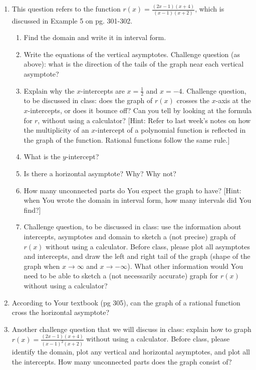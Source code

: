 \documentclass[12pt,dvipsnames]{article}
\begin{document}
\begin{enumerate}[label=\arabic*., leftmargin=2\parindent,
labelindent=\parindent, labelsep=*]
\begin{enumerate}
\end{enumerate}
\item This question refers to the function $\displaystyle r(x)=\frac{(2x-1)(x+4)}{(x-1)(x+2)}$, which is discussed in Example 5 on pg. 301-302.
\begin{enumerate}
\item Find the domain and write it in interval form.
\item Write the equations of the vertical asymptotes. Challenge question (as above): what is the direction of the tails of the graph near each vertical asymptote?
	\item Explain why the $x$-intercepts are $\displaystyle x=\frac{1}{2}$ and $x=-4$. Challenge question, to be discussed in class:  does the graph of $r(x)$ crosses the $x$-axis at the $x$-intercepts, or does it bounce off? Can you tell by looking at the formula for $r$, without using a calculator? [Hint: Refer to last week's notes on how the multiplicity of an $x$-intercept of a polynomial function is reflected in the graph of the function. Rational functions follow the same rule.]
\item What is the $y$-intercept?
\item Is there a horizontal asymptote? Why? Why not?
\item How many unconnected parts do You expect the graph to have? [Hint: when You wrote the domain in interval form, how many intervals did You find?]
\item Challenge question, to be discussed in class: use the information about intercepts, asymptotes and domain to sketch a (not precise) graph of $r(x)$ without using a calculator. Before class, please plot all asymptotes and intercepts, and draw the left and right tail of the graph (shape of the graph when $x\to \infty$ and $x\to -\infty$). What other information would You need to be able to sketch a (not necessarily accurate) graph for $r(x)$ without using a calculator?
	
\end{enumerate}

\item According to Your textbook (pg 305), can the graph of a rational function cross the horizontal asymptote? 

\item Another challenge question that we will discuss in class:  explain how to graph $\displaystyle r(x)=\frac{(2x-1)(x+4)}{(x-1)^2(x+2)}$ without using a calculator. Before class, please identify the domain, plot any vertical and horizontal asymptotes, and plot all the intercepts. How many unconnected parts does the graph consist of? 


\end{enumerate}
\end{document}
